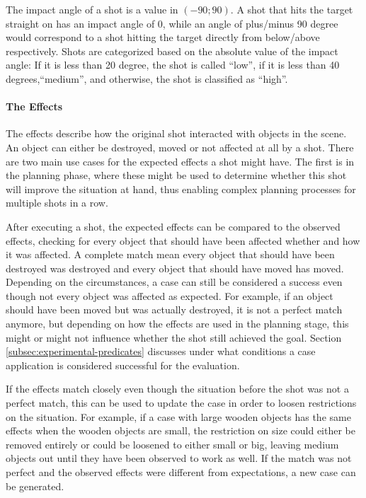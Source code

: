 The impact angle of a shot is a value in $(-90;90)$. A shot that hits the target straight on has an impact angle of 0, while an angle of plus/minus 90 degree would correspond to a shot hitting the target directly from below/above respectively. Shots are categorized based on the absolute value of the impact angle: If it is less than 20 degree, the shot is called ``low'', if it is less than 40 degrees,``medium'', and otherwise, the shot is classified as ``high''.



\paragraph{The Effects}
The effects describe how the original shot interacted with objects in the scene. 
An object can either be destroyed, moved or not affected at all by a shot. There are two main use cases for the expected effects a shot might have.
The first is in the planning phase, where these might be used to determine whether this shot will improve the situation at hand, thus enabling complex planning processes for multiple shots in a row.

After executing a shot, the expected effects can be compared to the observed effects, checking for every object that should have been affected whether and how it was affected.
A complete match mean every object that should have been destroyed was destroyed and every object that should have moved has moved.
Depending on the circumstances, a case can still be considered a success even though not every object was affected as expected.
For example, if an object should have been moved but was actually destroyed, it is not a perfect match anymore, but depending on how the effects are used in the planning stage, this might or might not influence whether the shot still achieved the goal. Section \ref{subsec:experimental-predicates} discusses under what conditions a case application is considered successful for the evaluation.

If the effects match closely even though the situation before the shot was not a perfect match, this can be used to update the case in order to loosen restrictions on the situation. 
For example, if a case with large wooden objects has the same effects when the wooden objects are small, the restriction on size could either be removed entirely or could be loosened to either small or big, leaving medium objects out until they have been observed to work as well.
If the match was not perfect and the observed effects were different from expectations, a new case can be generated.

